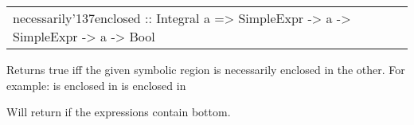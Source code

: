 \begin{haddockdesc}
\item[\begin{tabular}{@{}l}
necessarily{\char '137}enclosed :: Integral a => SimpleExpr -> a -> SimpleExpr -> a -> Bool
\end{tabular}]
{\haddockbegindoc
Returns true iff the given symbolic region is necessarily enclosed in the other.
 For example:
     is enclosed in 
     is enclosed in \par
Will return  if the expressions contain bottom.\par}
\end{haddockdesc}